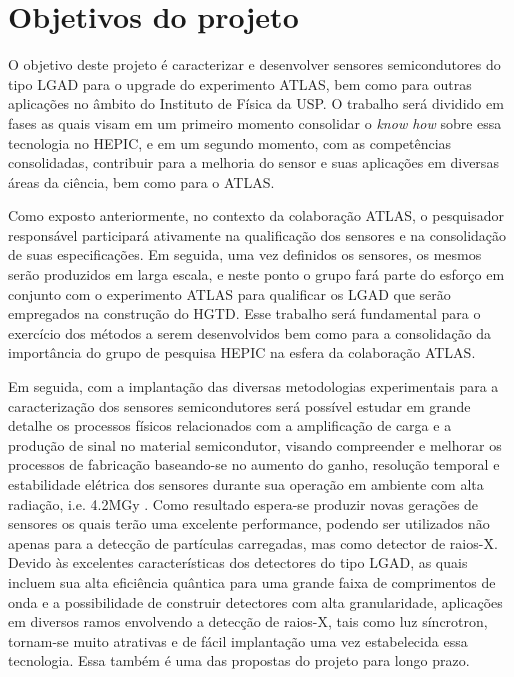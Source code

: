 \chapter{Objetivos do projeto}

O objetivo deste projeto é caracterizar e desenvolver sensores semicondutores do tipo LGAD para o upgrade do experimento ATLAS, bem como para outras aplicações no âmbito do Instituto de Física da USP. O trabalho será dividido em fases as quais visam em um primeiro momento consolidar o {\it know how} sobre essa tecnologia no HEPIC, e em um segundo momento, com as competências consolidadas, contribuir para a melhoria do sensor e suas aplicações em diversas áreas da ciência, bem como para o ATLAS.

Como exposto anteriormente, no contexto da colaboração ATLAS, o pesquisador responsável participará ativamente na qualificação dos sensores e na consolidação de suas especificações. Em seguida, uma vez definidos os sensores, os mesmos serão produzidos em larga escala, e neste ponto o grupo fará parte do esforço em conjunto com o experimento ATLAS para qualificar os LGAD que serão empregados na construção do HGTD. Esse trabalho será fundamental para o exercício dos métodos a serem desenvolvidos bem como para a consolidação da importância do grupo de pesquisa HEPIC na esfera da colaboração ATLAS.

Em seguida, com a implantação das diversas metodologias experimentais para a caracterização dos sensores semicondutores será possível estudar em grande detalhe os processos físicos relacionados com a amplificação de carga e a produção de sinal no material semicondutor, visando compreender e melhorar os processos de fabricação baseando-se no aumento do ganho, resolução temporal e estabilidade elétrica dos sensores durante sua operação em ambiente com alta radiação, i.e. 4.2MGy \cite{tdr}. 
Como resultado espera-se produzir novas gerações de sensores os quais terão uma excelente performance, podendo ser utilizados não apenas para a detecção de partículas carregadas, mas como detector de raios-X. Devido às excelentes características dos detectores do tipo LGAD, as quais incluem sua alta eficiência quântica para uma grande faixa de comprimentos de onda e a possibilidade de construir detectores com alta granularidade, aplicações em diversos ramos envolvendo a detecção de raios-X, tais como luz síncrotron, tornam-se muito atrativas e de fácil implantação uma vez estabelecida essa tecnologia. Essa também é uma das propostas do projeto para longo prazo.

